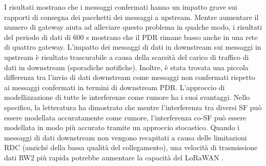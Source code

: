 \documentclass[a4paper]{report} %
\begin{document}
I risultati mostrano che i messaggi confermati hanno un impatto grave sui rapporti di consegna dei pacchetti dei messaggi a upstream. Mentre aumentare il numero di gateway aiuta ad alleviare questo problema in qualche modo, i risultati del periodo di dati di 600 s mostrano che il PDR rimane basso anche in una rete di quattro gateway. L'impatto dei messaggi di dati in downstream sui messaggi in upstream è risultato trascurabile a causa della scarsità del carico di traffico di dati in downstream (sporadiche notifiche). Inoltre, è stata trovata una piccola differenza tra l'invio di dati downstream come messaggi non confermati rispetto ai messaggi confermati in termini di downstream PDR. L'approccio di modellizzazione di tutte le interferenze come rumore ha i suoi svantaggi. Nello specifico, la letteratura ha dimostrato che mentre l'interferenza tra diversi SF può essere modellata accuratamente come rumore, l'interferenza co-SF può essere modellata in modo più accurato tramite un approccio stocastico. Quando i messaggi di dati downstream non vengono recapitati a causa delle limitazioni RDC (anziché della bassa qualità del collegamento), una velocità di trasmissione dati RW2 più rapida potrebbe aumentare la capacità del LoRaWAN \cite{art:rif.49}. 
\end{document}
